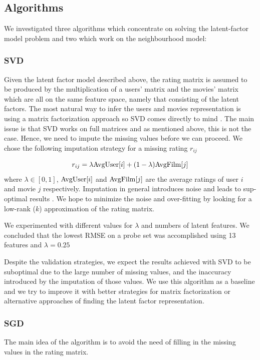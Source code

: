 \documentclass[10pt,conference,compsocconf]{IEEEtran}
\begin{document}
	\subsection{Algorithms}
	We investigated three algorithms which concentrate on solving the latent-factor model problem and two which work on the neighbourhood model:
	
	\subsubsection*{\textbf{SVD}} Given the latent factor model described above, the rating matrix is assumed to be produced by the multiplication of a users' matrix and the movies' matrix which are all on the same feature space, namely that consisting of the latent factors. The most natural way to infer the users and movies representation is using a matrix factorization approach so SVD comes directly to mind \cite{Koren09matrixfactorization}. The main issue is that SVD works on full matrices and as mentioned above, this is not the case. Hence, we need to impute the missing values before we can proceed. We chose the following imputation strategy for a missing rating $r_{ij}$
	
	\begin{equation}
	r_{ij}= \lambda \textnormal{AvgUser}[i] + (1 - \lambda) \textnormal{AvgFilm}[j]
	\label{eq:imputation}
	\end{equation}
	where $\lambda \in [0,1]$, $\textnormal{AvgUser}[i]$ and $\textnormal{AvgFilm}[j]$ are the average ratings of user $i$ and movie $j$ respectively. Imputation in general introduces noise and leads to sup-optimal results \cite{Koren09matrixfactorization}. We hope to minimize the noise and over-fitting by looking for a low-rank ($k$) approximation of the rating matrix. 
	
	We experimented with different values for $\lambda$ and numbers of latent features. We concluded that the lowest RMSE on a probe set was accomplished using 13 features and $\lambda = 0.25$
	
	Despite the validation strategies, we expect the results achieved with SVD to be suboptimal due to the large number of missing values, and the inaccuracy introduced by the imputation of those values. We use this algorithm as a baseline and we try to improve it with better strategies for matrix factorization or alternative approaches of finding the latent factor representation.
	
	\subsubsection*{\textbf{SGD}} The main idea of the algorithm is to avoid the need of filling in the missing values in the rating matrix. 
	
\end{document}
